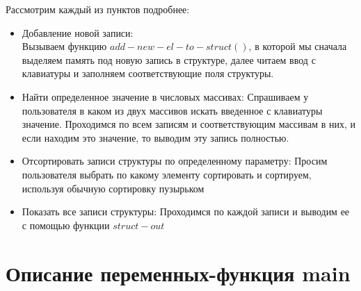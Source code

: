 \documentclass[a4paper,12pt]{report}
\begin{document}
Рассмотрим каждый из пунктов подробнее:\\
\begin{itemize}
    \item Добавление новой записи:\\
        Вызываем функцию $add-new-el-to-struct()$, в которой мы сначала выделяем память под новую запись в структуре, далее читаем ввод с клавиатуры и заполняем соответствующие поля структуры.
    \item Найти определенное значение в числовых массивах:
        Спрашиваем у пользователя в каком из двух массивов искать введенное с клавиатуры значение. Проходимся по всем записям и соответствующим массивам в них, и если находим это значение, то выводим эту запись полностью.
    \item Отсортировать записи структуры по определенному параметру:
        Просим пользователя выбрать по какому элементу сортировать и сортируем, используя обычную сортировку пузырьком
    \item Показать все записи структуры:
        Проходимся по каждой записи и выводим ее с помощью функции $struct-out$
\end{itemize}


\section*{Описание переменных-функция main}
\begin{centering}
\end{centering}
\end{document}

